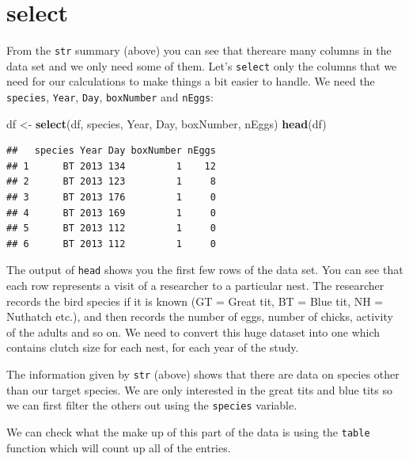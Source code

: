 \documentclass[
  a4paperpaper,
]{book}
\newenvironment{Shaded}{\begin{snugshade}}{\end{snugshade}}
\newcommand{\KeywordTok}[1]{\textcolor[rgb]{0.13,0.29,0.53}{\textbf{#1}}}
\newcommand{\NormalTok}[1]{#1}
\newcommand{\OperatorTok}[1]{\textcolor[rgb]{0.81,0.36,0.00}{\textbf{#1}}}
\newcommand{\StringTok}[1]{\textcolor[rgb]{0.31,0.60,0.02}{#1}}
\begin{document}
\hypertarget{select}{%
\section{select}\label{select}}

From the \texttt{str} summary (above) you can see that thereare many columns in the data set and we only need some of them. Let's \texttt{select} only the columns that we need for our calculations to make things a bit easier to handle. We need the \texttt{species}, \texttt{Year}, \texttt{Day}, \texttt{boxNumber} and \texttt{nEggs}:

\begin{Shaded}
\begin{Highlighting}[]
\NormalTok{df \textless{}{-}}\StringTok{ }\KeywordTok{select}\NormalTok{(df, species, Year, Day, boxNumber, nEggs)}
\KeywordTok{head}\NormalTok{(df)}
\end{Highlighting}
\end{Shaded}

\begin{verbatim}
##   species Year Day boxNumber nEggs
## 1      BT 2013 134         1    12
## 2      BT 2013 123         1     8
## 3      BT 2013 176         1     0
## 4      BT 2013 169         1     0
## 5      BT 2013 112         1     0
## 6      BT 2013 112         1     0
\end{verbatim}

The output of \texttt{head} shows you the first few rows of the data set. You can see that each row represents a visit of a researcher to a particular nest. The researcher records the bird species if it is known (GT = Great tit, BT = Blue tit, NH = Nuthatch etc.), and then records the number of eggs, number of chicks, activity of the adults and so on. We need to convert this huge dataset into one which contains clutch size for each nest, for each year of the study.

The information given by \texttt{str} (above) shows that there are data on species other than our target species. We are only interested in the great tits and blue tits so we can first filter the others out using the \texttt{species} variable.

We can check what the make up of this part of the data is using the \texttt{table} function which will count up all of the entries.

\begin{Shaded}
\end{Shaded}
\end{document}
